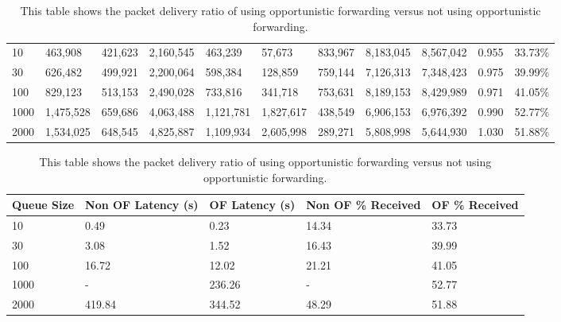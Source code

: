 {\begin{landscape}
\begin{table}
\begin{tabularx}{\linewidth}{|X|X|X|X|X|X|X|X|X|X|X|}
                        \hline
                        10 & 463,908 & 421,623 & 2,160,545 & 463,239 & 57,673 & 833,967 & 8,183,045 & 8,567,042 & 0.955 & 33.73\% \\
                        30 & 626,482 & 499,921 & 2,200,064 & 598,384 & 128,859 & 759,144 & 7,126,313 & 7,348,423 & 0.975 & 39.99\% \\
                        100 & 829,123 & 513,153 & 2,490,028 & 733,816 & 341,718 & 753,631 & 8,189,153 & 8,429,989 & 0.971 & 41.05\% \\
                        1000 & 1,475,528 & 659,686 & 4,063,488 & 1,121,781 & 1,827,617 & 438,549 & 6,906,153 & 6,976,392 & 0.990 & 52.77\% \\
                        2000 & 1,534,025 & 648,545 & 4,825,887 & 1,109,934 & 2,605,998 & 289,271 & 5,808,998 & 5,644,930 & 1.030 & 51.88\% \\
                        \hline
                    \end{tabularx}
                    \caption{These two tables are part of the same table, split across the page. They show the results of using opportunistic forwarding.}
                    \label{tab:opportunistic_forwarding_first}
                    \begin{tabularx}{0.6\linewidth}{|X|X|X|X|X|}
                        \hline
                        \multicolumn{1}{|X|}{\centering Queue Size} & 
                        \multicolumn{1}{|X|}{\centering Non OF Latency (s)} & 
                        \multicolumn{1}{|X|}{\centering OF Latency (s)} & 
                        \multicolumn{1}{|X|}{\centering Non OF \% Received} & 
                        \multicolumn{1}{|X|}{\centering OF \% Received} \\
                        \hline
                        10 & 0.49 & 0.23 & 14.34 & 33.73 \\
                        30 & 3.08 & 1.52 & 16.43 & 39.99 \\
                        100 & 16.72 & 12.02 & 21.21 & 41.05 \\
                        1000 & - & 236.26 & - & 52.77 \\
                        2000 & 419.84 & 344.52 & 48.29 & 51.88 \\
                        \hline
                    \end{tabularx}
                    \caption{This table shows the packet delivery ratio of using opportunistic forwarding versus not using opportunistic forwarding.}
                    \label{tab:opportunistic_forwarding}
                \end{table}
            \end{landscape}
        }

